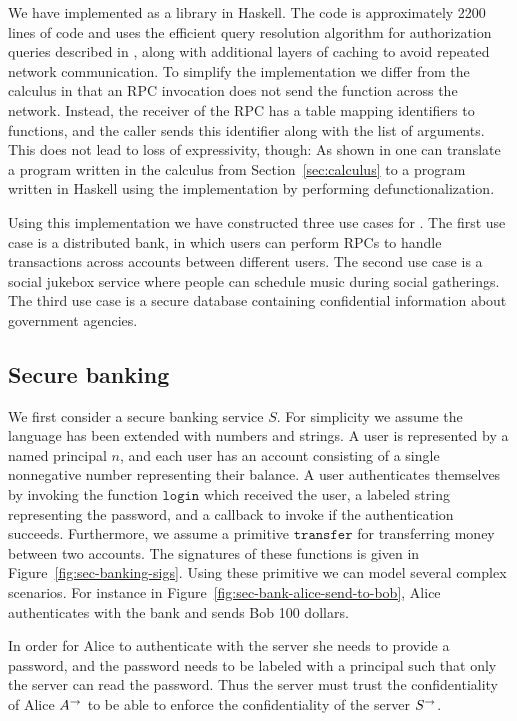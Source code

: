 We have implemented \lang{} as a library in Haskell. The code is approximately 2200 lines of code and uses the efficient query resolution algorithm for authorization queries described in \cite{Arden:2015:FA:2859845.2859998}, along with additional layers of caching to avoid repeated network communication. To simplify the implementation we differ from the calculus in that an RPC invocation does not send the function across the network. Instead, the receiver of the RPC has a table mapping identifiers to functions, and the caller sends this identifier along with the list of arguments. This does not lead to loss of expressivity, though: As shown in \cite{Cooper:2009:RC:1599410.1599439} one can translate a program written in the calculus from Section~\ref{sec:calculus} to a program written in Haskell using the \lang{} implementation by performing defunctionalization.

Using this implementation we have constructed three use cases for \lang. The first use case is a distributed bank, in which users can perform RPCs to handle transactions across accounts between different users. The second use case is a social jukebox service \cite{Lots of citations} where people can schedule music during social gatherings. The third use case is a secure database containing confidential information about government agencies.

\subsection{Secure banking}
We first consider a secure banking service $S$. For simplicity we assume the language has been extended with numbers and strings. A user is represented by a named principal $n$, and each user has an account consisting of a single nonnegative number representing their balance. A user authenticates themselves by invoking the function $\mathtt{login}$ which received the user, a labeled string representing the password, and a callback to invoke if the authentication succeeds. Furthermore, we assume a primitive $\mathtt{transfer}$ for transferring money between two accounts. The signatures of these functions is given in Figure~\ref{fig:sec-banking-sigs}.
Using these primitive we can model several complex scenarios. For instance in Figure~\ref{fig:sec-bank-alice-send-to-bob}, Alice authenticates with the bank and sends Bob 100 dollars.

In order for Alice to authenticate with the server she needs to provide a password, and the password needs to be labeled with a principal such that only the server can read the password. Thus the server must trust the confidentiality of Alice $A^{\rightarrow}$ to be able to enforce the confidentiality of the server $S^{\rightarrow}$. 

